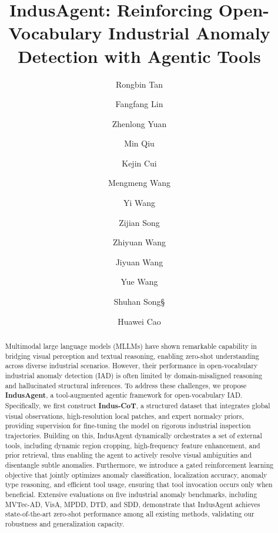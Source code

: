 \documentclass{llmxive}
\title{IndusAgent: Reinforcing Open-Vocabulary Industrial Anomaly Detection with Agentic Tools}
\author{Rongbin Tan \and Fangfang Lin \and Zhenlong Yuan \and Min Qiu \and Kejin Cui \and Mengmeng Wang \and Yi Wang \and Zijian Song \and Zhiyuan Wang \and Jiyuan Wang \and Yue Wang \and Shuhan Song§ \and Huawei Cao}
\begin{document}
\maketitle
\begin{abstract}


Multimodal large language models (MLLMs) have shown remarkable capability in bridging visual perception and textual reasoning, enabling zero-shot understanding across diverse industrial scenarios. However, their performance in open-vocabulary industrial anomaly detection (IAD) is often limited by domain-misaligned reasoning and hallucinated structural inferences. To address these challenges, we propose \textbf{IndusAgent}, a tool-augmented agentic framework for open-vocabulary IAD. Specifically, we first construct \textbf{Indus-CoT}, a structured dataset that integrates global visual observations, high-resolution local patches, and expert normalcy priors, providing supervision for fine-tuning the model on rigorous industrial inspection trajectories. Building on this, IndusAgent dynamically orchestrates a set of external tools, including dynamic region cropping, high-frequency feature enhancement, and prior retrieval, thus enabling the agent to actively resolve visual ambiguities and disentangle subtle anomalies. Furthermore, we introduce a gated reinforcement learning objective that jointly optimizes anomaly classification, localization accuracy, anomaly type reasoning, and efficient tool usage, ensuring that tool invocation occurs only when beneficial. Extensive evaluations on five industrial anomaly benchmarks, including MVTec-AD, VisA, MPDD, DTD, and SDD, demonstrate that IndusAgent achieves state-of-the-art zero-shot performance among all existing methods, validating our robustness and generalization capacity.
\end{abstract}
\end{document}
